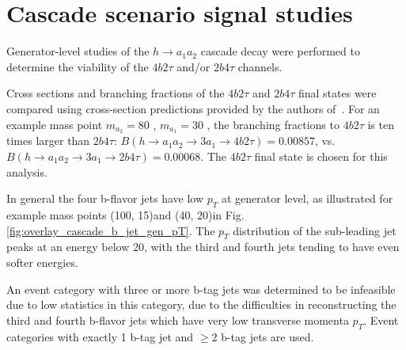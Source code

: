 \section{Cascade scenario signal studies}
\label{section:a1a2_gen_studies}
Generator-level studies of the $h\rightarrow a_1 a_2$ cascade decay were performed to determine the viability of the $4b2\tau$ and/or $2b4\tau$ channels. 

Cross sections and branching fractions of the $4b2\tau$ and $2b4\tau$ final states were compared using cross-section predictions provided by the authors of~\cite{Robens:2019kga}. For an example mass point $m_{a_2} = 80$ \GeV, $m_{a_1} = 30$ \GeV, the branching fractions to $4b2\tau$ is ten times larger than $2b4\tau$: $B(h \rightarrow a_1 a_2 \rightarrow 3 a_1 \rightarrow 4b2\tau) = 0.00857$, vs. $B(h \rightarrow a_1 a_2 \rightarrow 3 a_1 \rightarrow 2b4\tau) = 0.00068$. The $4b2\tau$ final state is chosen for this analysis.

In general the four b-flavor jets have low $p_{T}$ at generator level, as illustrated for example mass points (100, 15)\GeV and (40, 20)\GeV in Fig. \ref{fig:overlay_cascade_b_jet_gen_pT}. The $p_{T}$ distribution of the sub-leading jet peaks at an energy below 20\GeV, with the third and fourth jets tending to have even softer energies.

An event category with three or more b-tag jets was determined to be infeasible due to low statistics in this category, due to the difficulties in reconstructing the third and fourth b-flavor jets which have very low transverse momenta $p_{T}$. Event categories with exactly 1 b-tag jet and $\geq 2$ b-tag jets are used.


